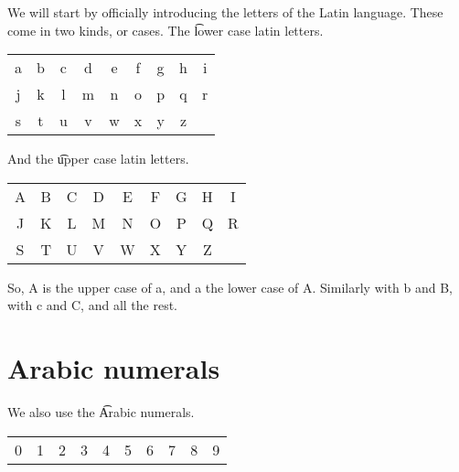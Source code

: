 We will start by officially introducing the letters of the Latin language.
These come in two kinds, or cases.
The \t{lower case latin letters}.
\begin{center}
\vspace{0.3cm}
\begin{tabular}{ccccccccc}
a & b & c & d & e & f & g & h & i\\
j & k & l & m & n & o & p & q & r\\
s & t & u & v & w & x & y & z & \\
\end{tabular}
\vspace{0.1cm}

%   
\end{center}
And the \t{upper case latin letters}.
\begin{center}
\vspace{0.3cm}
\begin{tabular}{ccccccccc}
A & B & C & D & E & F & G & H & I\\
J & K & L & M & N & O & P & Q & R\\
S & T & U & V & W & X & Y & Z & \\
\end{tabular}
\vspace{0.1cm}

\end{center}
So, A is the upper case of a, and a the lower case of A.
Similarly with b and B, with c and C, and all the rest.

\section*{Arabic numerals}

We also use the \t{Arabic numerals}.
\begin{center}
\vspace{0.3cm}
\begin{tabular}{cccccccccc}
0 & 1 & 2 & 3 & 4 & 5 & 6 & 7 & 8 & 9\\
\end{tabular}
\vspace{0.1cm}

\end{center}

